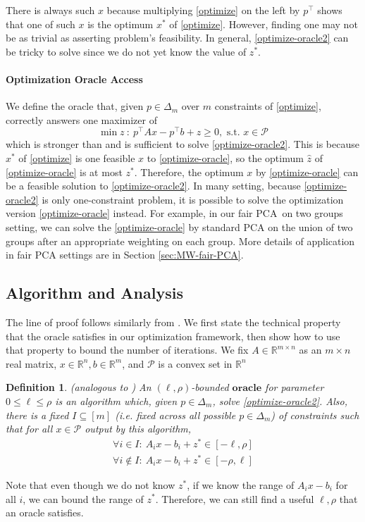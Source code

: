 \documentclass{article}
\newtheorem{definition}[theorem]{Definition} \newtheorem{claim}[theorem]{Claim}
\newcommand{\cP}{\mathcal{P}}
\newcommand{\oracle}{\mathbf{oracle}}
\newcommand{\R}{\mathbb{R}}
\begin{document}
   There is always such \(x\) because multiplying \eqref{optimize} on the left by \(p^\top\) shows that one of such \(x\) is the optimum \(x^*\) of \eqref{optimize}. However, finding one may not be as trivial as asserting problem's feasibility. In general, \eqref{optimize-oracle2} can be tricky to solve since we do not yet know the value of \(z^*\).

\paragraph{Optimization Oracle Access} We define the oracle that, given \(p\in \Delta_m\) over \(m\) constraints of \eqref{optimize}, correctly answers one maximizer of
\begin{equation}
\min z \ : \ p^\top Ax-p^\top b+z \geq0 , \text{ s.t. }x\in \cP  \label{optimize-oracle}
 \end{equation}
which is stronger than and is  sufficient to solve \eqref{optimize-oracle2}. This is because \(x^*\) of \eqref{optimize} is one feasible \(x\) to \eqref{optimize-oracle}, so the optimum \(\hat{z}\) of \eqref{optimize-oracle} is at most \(z^*\). Therefore, the optimum \(x\) by \eqref{optimize-oracle} can be a feasible solution to \eqref{optimize-oracle2}. In many setting, because \eqref{optimize-oracle2} is only one-constraint problem, it is possible to solve the optimization version \eqref{optimize-oracle} instead. For example, in our fair PCA\ on two groups setting, we can solve the \eqref{optimize-oracle} by standard PCA on the union of two groups after an appropriate weighting on each group. More details of application in fair PCA settings are in Section \ref{sec:MW-fair-PCA}.
\subsection{Algorithm and Analysis} \label{sec:MW-alg-ana}
The line of proof follows similarly from  \citet{arora2012multiplicative}. We first state the technical property that the oracle satisfies in our optimization framework, then  show how to use that property to bound the number of iterations.
We fix \(A\in \R^{m\times n}\) as  an \(m\times n\) real matrix, \(x\in \R^n,b\in\R^m\), and \(\cP\) is a convex set in \(\R^n\)\begin{definition}
(analogous to \citet{arora2012multiplicative}) An \((\ell,\rho)\)-bounded \(\oracle\) for parameter \(0\leq \ell\leq \rho\) is an algorithm which, given  \(p\in\Delta_m\), solve \eqref{optimize-oracle2}. Also, there is a fixed \(I\subseteq[m]\) (i.e. fixed across all possible \(p\in\Delta_m\)) of constraints such that for all \(x\in \cP\) output by this algorithm,
\begin{align}
\forall i\in I: \ A_i x - b_i+z^* \in [-\ell,\rho] \\
\forall i\notin I: \ A_i x - b_i +z^*\in [-\rho,\ell]
\end{align}
\end{definition}
Note that even though we do not know \(z^*\), if we know the range of \(A_ix-b_i\) for all \(i\), we can  bound the range of \(z^*\). Therefore, we can still find a useful \(\ell,\rho\) that an oracle satisfies.
\end{document}
